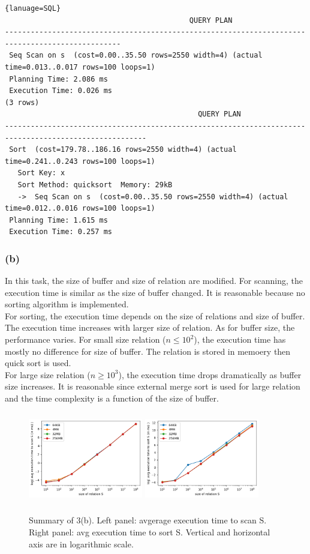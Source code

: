 \documentclass[10pt]{article}
\begin{document}
\begin{lstlisting}{lanuage=SQL}
                                           QUERY PLAN
-------------------------------------------------------------------------------------------------
 Seq Scan on s  (cost=0.00..35.50 rows=2550 width=4) (actual time=0.013..0.017 rows=100 loops=1)
 Planning Time: 2.086 ms
 Execution Time: 0.026 ms
(3 rows)
                                             QUERY PLAN
-------------------------------------------------------------------------------------------------------
 Sort  (cost=179.78..186.16 rows=2550 width=4) (actual time=0.241..0.243 rows=100 loops=1)
   Sort Key: x
   Sort Method: quicksort  Memory: 29kB
   ->  Seq Scan on s  (cost=0.00..35.50 rows=2550 width=4) (actual time=0.012..0.016 rows=100 loops=1)
 Planning Time: 1.615 ms
 Execution Time: 0.257 ms
\end{lstlisting}
\subsubsection*{(b)}
In this task, the size of buffer and size of relation are modified. For scanning, the execution time is similar as the size of buffer changed. It is reasonable because no sorting algorithm is implemented.\\
For sorting, the execution time depends on the size of relations and size of buffer. The execution time increases with larger size of relation. As for buffer size, the performance varies. For small size relation ($n\leq 10^2$), the execution time has mostly no difference for size of buffer. The relation is stored in memoery then quick sort is used.\\
For large size relation ($n\geq 10^3$), the execution time drops dramatically as buffer size increases. It is reasonable since external merge sort is used for large relation and the time complexity is a function of the size of buffer.
\begin{figure}[H]
\begin{center}
\includegraphics[width=5cm, height=4cm]{3b-1.png}
\includegraphics[width=5cm, height=4cm]{3b-2.png}
\caption{Summary of 3(b). Left panel: avgerage execution time to scan S. Right panel: avg execution time to sort S. Vertical and horizontal axis are in  logarithmic scale.}
\end{center}
\end{figure}
\end{document}
